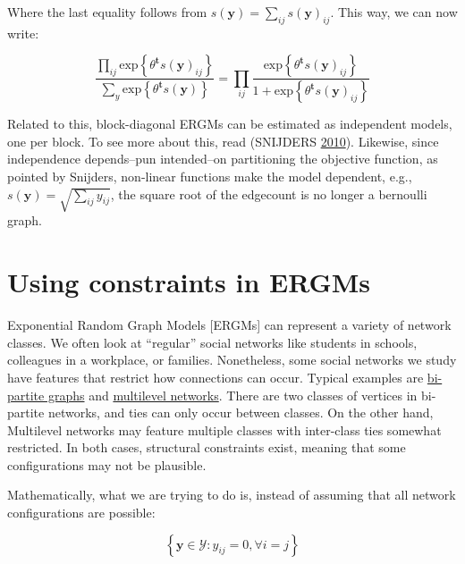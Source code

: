 \documentclass[]{book}
\begin{document}
Where the last equality follows from \(s\left(\mathbf{y}\right) = \sum_{ij}{s\left(\mathbf{y}\right)_{ij}}\). This way, we can now write:

\begin{equation}
\frac{\prod_{ij}\mbox{exp}\left\{{\theta}^\mathbf{t}s\left(\mathbf{y}\right)_{ij}\right\}}{\sum_{y}\mbox{exp}\left\{{\theta}^\mathbf{t}s\left(\mathbf{y}\right)\right\}} = 
\prod_{ij}\frac{\mbox{exp}\left\{{\theta}^\mathbf{t}s\left(\mathbf{y}\right)_{ij}\right\}}{1 + \mbox{exp}\left\{{\theta}^\mathbf{t}s\left(\mathbf{y}\right)_{ij}\right\}}
\end{equation}

Related to this, block-diagonal ERGMs can be estimated as independent models, one per block. To see more about this, read (SNIJDERS \protect\hyperlink{ref-Snijders2010margin}{2010}). Likewise, since independence depends--pun intended--on partitioning the objective function, as pointed by Snijders, non-linear functions make the model dependent, e.g., \(s\left(\mathbf{y}\right) = \sqrt{\sum_{ij}y_{ij}}\), the square root of the edgecount is no longer a bernoulli graph.

\renewcommand{\Pr}[1]{\mathbb{P}{#1}}

\hypertarget{using-constraints-in-ergms}{%
\chapter{Using constraints in ERGMs}\label{using-constraints-in-ergms}}

Exponential Random Graph Models {[}ERGMs{]} can represent a variety of
network classes. We often look at ``regular'' social networks
like students in schools, colleagues in a workplace, or families. Nonetheless,
some social networks we study have features that restrict how connections can
occur. Typical examples are \href{https://en.wikipedia.org/wiki/Bipartite_graph}{bi-partite graphs}
and \href{https://cran.r-project.org/web/packages/mlergm/vignettes/mlergm_tutorial.html}{multilevel networks}.
There are two classes of vertices in bi-partite networks, and ties can only
occur between classes. On the other hand, Multilevel networks may feature
multiple classes with inter-class ties somewhat restricted. In both cases,
structural constraints exist, meaning that some configurations may not
be plausible.

Mathematically, what we are trying to do is, instead of assuming that
all network configurations are possible:

\[
\left\{\mathbf{y} \in \mathcal{Y}: y_{ij} = 0, \forall i = j\right\}
\]
\end{document}
